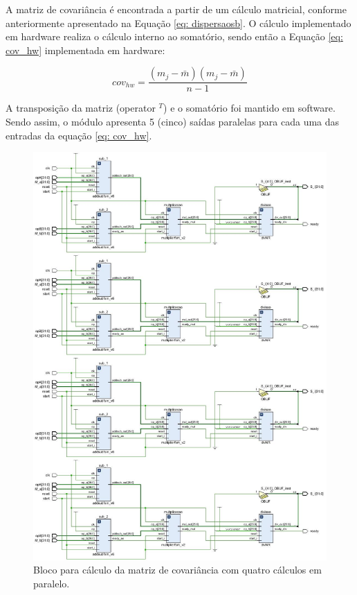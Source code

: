 A matriz de covariância é encontrada a partir de um cálculo matricial, conforme anteriormente apresentado na Equação \ref{eq: dispersaosb}. O cálculo implementado em hardware realiza o cálculo interno ao somatório, sendo então a Equação \ref{eq: cov_hw} implementada em hardware:

\begin{equation}
\label{eq: cov_hw}
cov_{hw} = \frac{(m_j - \bar m)(m_j -\bar m)}{n - 1} 
\end{equation}

A transposição da matriz (operator $^T$) e o somatório foi mantido em software. Sendo assim, o módulo apresenta 5 (cinco) saídas paralelas para cada uma das entradas da equação \ref{eq: cov_hw}.\\
\newpage

\begin{figure}[h]
	\centering
	\includegraphics[keepaspectratio=true,scale=0.35]{figuras/rtl_covariancia.png}
	\caption{Bloco para cálculo da matriz de covariância com quatro cálculos em paralelo.}
	\label{covariancia}
\end{figure}

